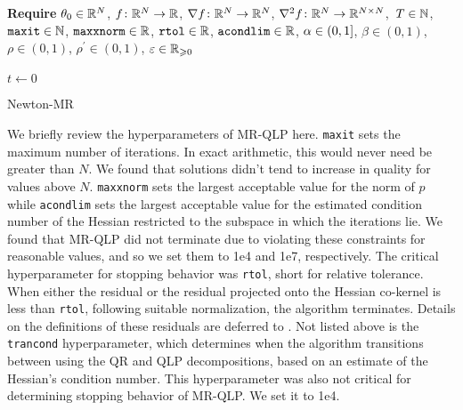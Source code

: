 \documentclass[../../thesis.tex]{subfiles}
\begin{document}
\begin{algorithm}[h]
    \SetAlgoLined{}
    \textbf{Require}
    $\theta_0 \in \mathbb{R}^N$,
    $f\colon\mathbb{R}^N\to\mathbb{R}$,
    $\nabla{f}\colon\mathbb{R}^N\to\mathbb{R}^N$,
    $\nabla^2{f}\colon\mathbb{R}^N\to\mathbb{R}^{N\times N}$,\
    $T\in \mathbb{N}$,\\
    $\texttt{maxit} \in \mathbb{N}$,
    $\texttt{maxxnorm} \in \mathbb{R}$,
    $\texttt{rtol} \in \mathbb{R}$,
    $\texttt{acondlim} \in \mathbb{R}$,
    $\alpha \in \intervaloc{0}{1}$,
    $\beta \in (0, 1)$,
    $\rho \in (0, 1)$,
    $\rho^\prime \in (0, 1)$,
    $\varepsilon \in \mathbb{R}_{\geqslant 0}$\\ \ \\
    $t \leftarrow 0$\\
    \caption{Newton-MR}

\end{algorithm}

We briefly review the hyperparameters of
MR-QLP here.
\texttt{maxit} sets the maximum number of iterations.
In exact arithmetic, this would never need be greater than $N$.
We found that solutions didn't tend to increase in quality
for values above $N$.
\texttt{maxxnorm} sets the largest acceptable value for the norm of $p$
while \texttt{acondlim} sets the largest acceptable value
for the estimated condition number of the Hessian restricted
to the subspace in which the iterations lie.
We found that MR-QLP did not terminate due to violating these constraints
for reasonable values,
and so we set them to 1e4 and 1e7, respectively.
The critical hyperparameter for stopping behavior was \texttt{rtol},
short for relative tolerance.
When either the
residual or the residual projected onto the Hessian co-kernel
is less than \texttt{rtol},
following suitable normalization,
the algorithm terminates.
Details on the definitions of these residuals
are deferred to .
Not listed above is the \texttt{trancond} hyperparameter,
which determines when the algorithm transitions between
using the QR and QLP decompositions,
based on an estimate of the Hessian's condition number.
This hyperparameter was also not critical
for determining stopping behavior of MR-QLP\@.
We set it to 1e4.
\end{document}
